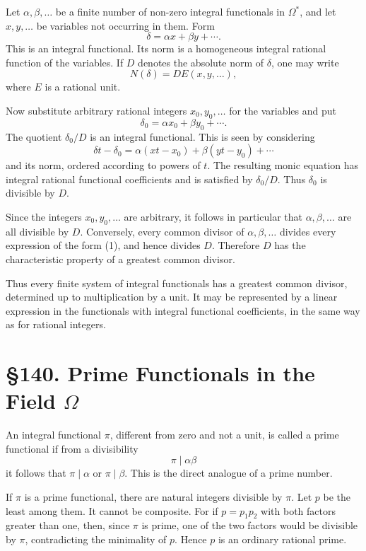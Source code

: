 \documentclass[12pt,a4paper]{article}
\newcommand{\webersection}[2]{\clearpage\section*{\S #1. #2}}
\begin{document}
Let \(\alpha,\beta,\ldots\) be a finite number of non-zero integral functionals in \(\Omega^*\), and let \(x,y,\ldots\) be variables not occurring in them.  Form
\begin{equation}
 \delta=\alpha x+
\beta y+
\cdots . \tag{1}
\end{equation}
This is an integral functional.  Its norm is a homogeneous integral rational function of the variables.  If \(D\) denotes the absolute norm of \(\delta\), one may write
\begin{equation}
 N(\delta)=D E(x,y,\ldots), \tag{2}
\end{equation}
where \(E\) is a rational unit.

Now substitute arbitrary rational integers \(x_0,y_0,
\ldots\) for the variables and put
\[
 \delta_0=\alpha x_0+
\beta y_0+
\cdots .
\]
The quotient \(\delta_0/D\) is an integral functional.  This is seen by considering
\[
 \delta t-
\delta_0=\alpha(xt-x_0)+
\beta(yt-y_0)+
\cdots
\]
and its norm, ordered according to powers of \(t\).  The resulting monic equation has integral rational functional coefficients and is satisfied by \(\delta_0/D\).  Thus \(\delta_0\) is divisible by \(D\).

Since the integers \(x_0,y_0,
\ldots\) are arbitrary, it follows in particular that \(\alpha,
\beta,
\ldots\) are all divisible by \(D\).  Conversely, every common divisor of \(\alpha,
\beta,
\ldots\) divides every expression of the form (1), and hence divides \(D\).  Therefore \(D\) has the characteristic property of a greatest common divisor.

Thus every finite system of integral functionals has a greatest common divisor, determined up to multiplication by a unit.  It may be represented by a linear expression in the functionals with integral functional coefficients, in the same way as for rational integers.

\webersection{140}{Prime Functionals in the Field \(\Omega\)}

An integral functional \(\pi\), different from zero and not a unit, is called a prime functional if from a divisibility
\[
 \pi\mid \alpha\beta
\]
it follows that \(\pi\mid\alpha\) or \(\pi\mid\beta\).  This is the direct analogue of a prime number.

If \(\pi\) is a prime functional, there are natural integers divisible by \(\pi\).  Let \(p\) be the least among them.  It cannot be composite.  For if \(p=p_1p_2\) with both factors greater than one, then, since \(\pi\) is prime, one of the two factors would be divisible by \(\pi\), contradicting the minimality of \(p\).  Hence \(p\) is an ordinary rational prime.
\end{document}

